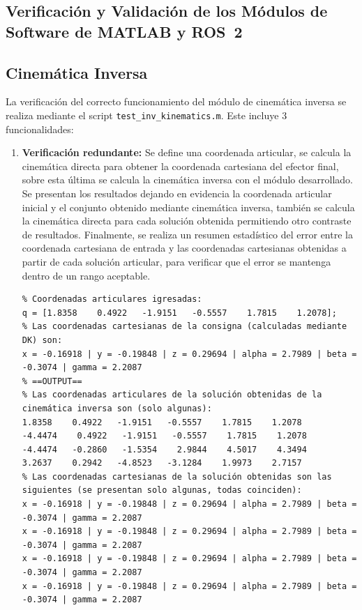 \documentclass{article}
\begin{document}
\newpage
\begin{appendices}
\section{Verificación y Validación de los Módulos de Software de MATLAB y ROS~2}

\subsection{Cinemática Inversa}
\label{ap:IK}

La verificación del correcto funcionamiento del módulo de cinemática inversa se realiza mediante el script \colorbox{gray!20}{\texttt{test\_inv\_kinematics.m}}. Este incluye 3 funcionalidades:

\begin{enumerate}
    \item \textbf{Verificación redundante:} Se define una coordenada articular, se calcula la cinemática directa para obtener la coordenada cartesiana del efector final, sobre esta última se calcula la cinemática inversa con el módulo desarrollado. Se presentan los resultados dejando en evidencia la coordenada articular inicial y el conjunto obtenido mediante cinemática inversa, también se calcula la cinemática directa para cada solución obtenida permitiendo otro contraste de resultados. Finalmente, se realiza un resumen estadístico del error entre la coordenada cartesiana de entrada y las coordenadas cartesianas obtenidas a partir de cada solución articular, para verificar que el error se mantenga dentro de un rango aceptable.
\begin{lstlisting}[style=Matlab-editor, basicstyle=\small\ttfamily]
% ==INPUT ==
% Coordenadas articulares igresadas:
q = [1.8358    0.4922   -1.9151   -0.5557    1.7815    1.2078];
% Las coordenadas cartesianas de la consigna (calculadas mediante DK) son: 
x = -0.16918 | y = -0.19848 | z = 0.29694 | alpha = 2.7989 | beta = -0.3074 | gamma = 2.2087
% ==OUTPUT==
% Las coordenadas articulares de la solución obtenidas de la cinemática inversa son (solo algunas):
1.8358    0.4922   -1.9151   -0.5557    1.7815    1.2078
-4.4474    0.4922   -1.9151   -0.5557    1.7815    1.2078
-4.4474   -0.2860   -1.5354    2.9844    4.5017    4.3494
3.2637    0.2942   -4.8523   -3.1284    1.9973    2.7157
% Las coordenadas cartesianas de la solución obtenidas son las siguientes (se presentan solo algunas, todas coinciden):
x = -0.16918 | y = -0.19848 | z = 0.29694 | alpha = 2.7989 | beta = -0.3074 | gamma = 2.2087
x = -0.16918 | y = -0.19848 | z = 0.29694 | alpha = 2.7989 | beta = -0.3074 | gamma = 2.2087
x = -0.16918 | y = -0.19848 | z = 0.29694 | alpha = 2.7989 | beta = -0.3074 | gamma = 2.2087
x = -0.16918 | y = -0.19848 | z = 0.29694 | alpha = 2.7989 | beta = -0.3074 | gamma = 2.2087



\end{lstlisting}
\end{enumerate}
\end{appendices}
\end{document}
